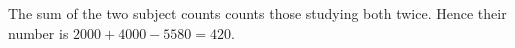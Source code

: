 The sum of the two subject counts counts those studying both twice. Hence their number is $2000+4000-5580=\boxed{420}$.
